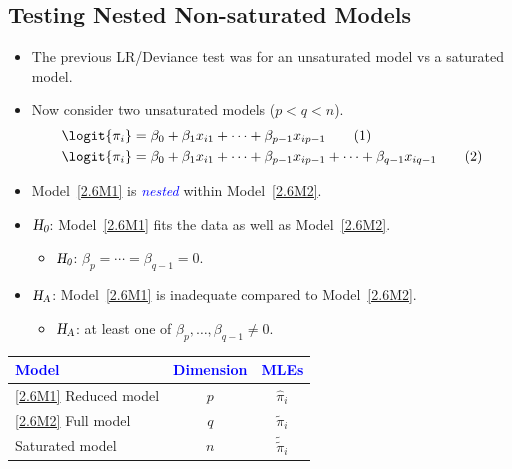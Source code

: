 \documentclass[oneside]{book}\usepackage[]{graphicx}\usepackage[svgnames]{xcolor}
\newcommand{\HN}{\textsl{H}_{\textsl{0}}}%
\newcommand{\HA}{\textsl{H}_{\textsl{A}}}%
\begin{document}
\subsection*{Testing Nested Non-saturated Models}
\begin{itemize}
      \item The previous LR/Deviance test was for an unsaturated model vs a saturated model.
      \item Now consider two unsaturated models ($ p<q<n $).
            \begin{align*}
                  \logit{\pi_i} & =\beta_0+\beta_1x_{i1}+\cdots+\beta_{p-1}x_{ip-1}\tag*{(1)}\label{2.6M1}                            \\
                  \logit{\pi_i} & =\beta_0+\beta_1x_{i1}+\cdots+\beta_{p-1}x_{ip-1}+\cdots+\beta_{q-1}x_{iq-1}\tag*{(2)}\label{2.6M2}
            \end{align*}
      \item Model~\ref{2.6M1} is \textcolor{Blue}{\emph{nested}} within Model~\ref{2.6M2}.
      \item $ \HN $: Model~\ref{2.6M1} fits the data as well as Model~\ref{2.6M2}.
            \begin{itemize}
                  \item $ \HN $: $ \beta_p=\cdots=\beta_{q-1}=0 $.
            \end{itemize}
      \item $ \HA $: Model~\ref{2.6M1} is inadequate compared to Model~\ref{2.6M2}.
            \begin{itemize}
                  \item $ \HA $: at least one of $ \beta_p,\ldots,\beta_{q-1}\ne 0 $.
            \end{itemize}
\end{itemize}
\begin{table}[!htbp]
      \centering
      \begin{tabular}{lcc}
            \textcolor{Blue}{Model}   & \textcolor{Blue}{Dimension} & \textcolor{Blue}{MLEs}    \\
            \midrule
            \ref{2.6M1} Reduced model & $ p $                       & $ \hat{\pi}_i $           \\
            \ref{2.6M2} Full model    & $ q $                       & $ \tilde{\pi}_i $         \\
            Saturated model           & $ n $                       & $ \tilde{\tilde{\pi}}_i $ \\
            \bottomrule
      \end{tabular}
\end{table}
\end{document}
